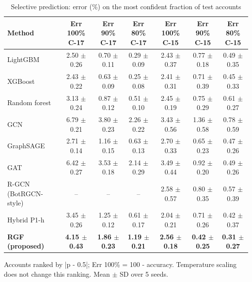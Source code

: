 \begin{table}[!t]
\centering
\caption{Selective prediction: error (\%) on the most confident fraction of test accounts}
\label{tab:selective_prediction}
\footnotesize
\setlength{\tabcolsep}{3pt}
\begin{tabular}{lcccccc}
\hline
\textbf{Method} & \textbf{Err 100\% C-17} & \textbf{Err 90\% C-17} & \textbf{Err 80\% C-17} & \textbf{Err 100\% C-15} & \textbf{Err 90\% C-15} & \textbf{Err 80\% C-15} \\
\hline
LightGBM & 2.50 $\pm$ 0.26 & 0.70 $\pm$ 0.11 & 0.29 $\pm$ 0.09 & 2.43 $\pm$ 0.37 & 0.77 $\pm$ 0.18 & 0.49 $\pm$ 0.35 \\
XGBoost & 2.43 $\pm$ 0.22 & 0.63 $\pm$ 0.09 & 0.25 $\pm$ 0.08 & 2.41 $\pm$ 0.31 & 0.71 $\pm$ 0.39 & 0.45 $\pm$ 0.33 \\
Random forest & 3.13 $\pm$ 0.24 & 0.87 $\pm$ 0.12 & 0.51 $\pm$ 0.10 & 2.45 $\pm$ 0.19 & 0.75 $\pm$ 0.29 & 0.61 $\pm$ 0.27 \\
GCN & 6.79 $\pm$ 0.21 & 3.80 $\pm$ 0.23 & 2.26 $\pm$ 0.22 & 3.43 $\pm$ 0.56 & 1.36 $\pm$ 0.58 & 0.78 $\pm$ 0.59 \\
GraphSAGE & 2.71 $\pm$ 0.14 & 1.16 $\pm$ 0.15 & 0.63 $\pm$ 0.13 & 2.70 $\pm$ 0.33 & 0.65 $\pm$ 0.23 & 0.47 $\pm$ 0.26 \\
GAT & 6.42 $\pm$ 0.27 & 3.53 $\pm$ 0.18 & 2.14 $\pm$ 0.29 & 3.49 $\pm$ 0.44 & 0.92 $\pm$ 0.20 & 0.49 $\pm$ 0.26 \\
R-GCN (BotRGCN-style) & -- & -- & -- & 2.58 $\pm$ 0.57 & 0.80 $\pm$ 0.35 & 0.57 $\pm$ 0.39 \\
Hybrid P1-h & 3.45 $\pm$ 0.26 & 1.25 $\pm$ 0.12 & 0.61 $\pm$ 0.17 & 2.04 $\pm$ 0.21 & 0.71 $\pm$ 0.26 & 0.42 $\pm$ 0.37 \\
\textbf{RGF (proposed)} & \textbf{4.15 $\pm$ 0.43} & \textbf{1.86 $\pm$ 0.23} & \textbf{1.19 $\pm$ 0.21} & \textbf{2.56 $\pm$ 0.18} & \textbf{0.42 $\pm$ 0.25} & \textbf{0.31 $\pm$ 0.27} \\
\hline
\end{tabular}
\par\smallskip\parbox{\linewidth}{\scriptsize Accounts ranked by |p - 0.5|; Err 100\% = 100 - accuracy. Temperature scaling does not change this ranking. Mean $\pm$ SD over 5 seeds.}
\end{table}

